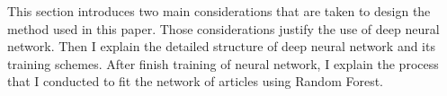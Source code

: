 This section introduces two main considerations that are taken to design the method used in this paper.
Those considerations justify the use of deep neural network.
Then I explain the detailed structure of deep neural network and its training schemes.
After finish training of neural network, I explain the process that I conducted to fit the network of articles using Random Forest.
